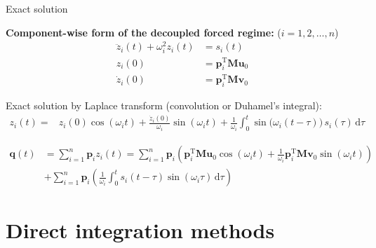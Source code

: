 \documentclass[aspectratio=169]{beamer}
\begin{document}
\begin{frame}{Exact solution}
  \small
  \vspace{-0.3cm}
  \begin{block}{}
    \textbf{Component-wise form of the decoupled forced regime:} ($i = 1,2,\dots,n$)
    \begin{align*}
      \ddot{z}_i(t) + \omega_{i}^2 z_i(t) & = s_{i}(t)                                        \\
      z_i(0)                              & = \mathbf{p}_{i}^\mathrm{T} \mathbf M\mathbf{u}_0 \\
      \dot{z}_i(0)                        & = \mathbf{p}_{i}^\mathrm{T}\mathbf M \mathbf{v}_0
    \end{align*}
  \end{block}
  Exact solution by Laplace transform (convolution or Duhamel's integral):
  \begin{align*}
    z_i(t) ={} & z_i(0)\cos(\omega_i t)
    + \frac{\dot z_i(0)}{\omega_i}\sin(\omega_i t)
    + \frac{1}{\omega_i}
    \int_0^t \sin\!\big(\omega_i (t-\tau)\big)\, s_i(\tau)\,\mathrm d\tau
  \end{align*}
  \begin{block}{}
    \vspace{-0.3cm}
    \begin{align*}
      \mathbf{q}(t) & =  \sum_{i=1}^n \mathbf{p}_{i}z_i(t) = \sum_{i=1}^n \mathbf{p}_{i} \left( \mathbf{p}_{i}^{\mathrm{T}} \mathbf{M} \mathbf{u}_0 \cos(\omega_{i} t)
      + \frac{1}{\omega_{i}} \mathbf{p}_{i}^{\mathrm{T}} \mathbf{M} \mathbf{v}_0 \sin(\omega_{i} t) \right)                                                            \\
                    & + \sum_{i=1}^n \mathbf{p}_{i} \left( \frac{1}{\omega_{i}} \int_0^t s_{i}(t - \tau) \sin(\omega_{i} \tau) \, \mathrm{d}\tau\right)
    \end{align*}
  \end{block}
\end{frame}

\section{Direct integration methods}
\end{document}
